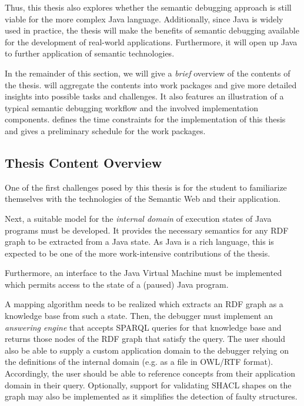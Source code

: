 \documentclass[
	english,
	accentcolor=9c,%
  marginpar=0cm %
	]{tudapub}
\begin{document}
Thus, this thesis also explores whether the semantic debugging approach is still
viable for the more complex Java language.
Additionally, since Java is widely used in practice, the thesis will make the benefits of
semantic debugging available for the development of real-world applications.
Furthermore, it will open up Java to further application of semantic
technologies.

In the remainder of this section, we will give a \emph{brief} overview of the
contents of the thesis.  will aggregate the contents
into work packages and give more detailed insights into possible tasks and
challenges. It also features an illustration of a typical semantic debugging
workflow and the involved implementation components.
 defines the time constraints for the implementation
of this thesis and gives a preliminary schedule for the work packages.

\subsection{Thesis Content Overview}

One of the first challenges posed by this thesis is for the student to
familiarize themselves with the technologies of the Semantic Web and their
application.

Next, a suitable model for the \emph{internal domain} of execution states of
Java programs must be developed. It provides the necessary semantics for any RDF
graph to be extracted from a Java state.
As Java is a rich language, this is expected to be one of the more
work-intensive contributions of the thesis.

Furthermore, an interface to the Java Virtual Machine must be implemented which
permits access to the state of a (paused) Java program.

A mapping algorithm needs to be realized which extracts an RDF graph as
a knowledge base from such a state.
Then, the debugger must implement an \emph{answering engine} that
accepts SPARQL queries for that knowledge base and returns those nodes of the
RDF graph that satisfy the query.
The user should also be able to supply a custom application domain to the
debugger relying on the definitions of the internal domain
(e.g. as a file in OWL/RTF format).
Accordingly, the user should be able to reference concepts from their
application domain in their query.
Optionally, support for validating SHACL shapes on the graph may also be implemented as it
simplifies the detection of faulty structures.
\end{document}
